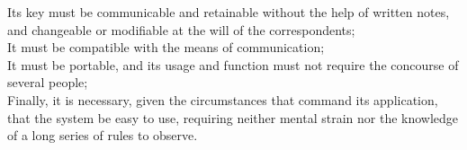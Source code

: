 \documentclass[a4paper,10pt]{extarticle}
\begin{document}
\begin{enumerate}
\begin{enumerate}
        Its key must be communicable and retainable without the help of written notes, and changeable or modifiable at the will of the correspondents;\\
        It must be compatible with the means of communication;\\
        It must be portable, and its usage and function must not require the concourse of several people;\\
        Finally, it is necessary, given the circumstances that command its application, that the system be easy to use, requiring neither mental strain nor the knowledge of a long series of rules to observe.
    \end{enumerate}
\end{enumerate}
\end{document}
